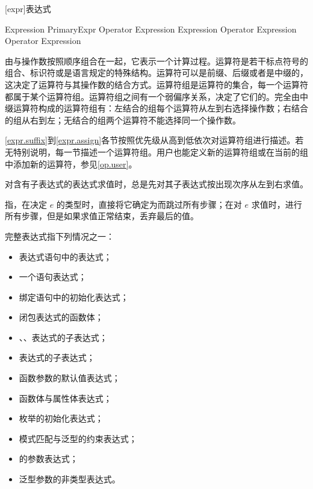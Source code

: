 
[expr]{表达式}

\begin{bnf}{Expression}
    PrimaryExpr \br
    Operator Expression \br
    Expression Operator \br
    Expression Operator Expression
\end{bnf}

\pnum
{}由与操作数按照顺序组合在一起，它表示一个计算过程。运算符是若干标点符号的组合、标识符或是语言规定的特殊结构。运算符可以是前缀、后缀或者是中缀的，这决定了运算符与其操作数的结合方式。运算符组是运算符的集合，每一个运算符都属于某个运算符组。运算符组之间有一个弱偏序关系，决定了它们的。完全由中缀运算符构成的运算符组有：左结合的组每个运算符从左到右选择操作数；右结合的组从右到左；无结合的组两个运算符不能选择同一个操作数。

\pnum
\ref{expr.suffix}到\ref{expr.assign}各节按照优先级从高到低依次对运算符组进行描述。若无特别说明，每一节描述一个运算符组。用户也能定义新的运算符组或在当前的组中添加新的运算符，参见\ref{op.user}。

\pnum
对含有子表达式的表达式求值时，总是先对其子表达式按出现次序从左到右求值。

\pnum
{}指，在决定 $e$ 的类型时，直接将它确定为而跳过所有步骤；在对 $e$ 求值时，进行所有步骤，但是如果求值正常结束，丢弃最后的值。

\pnum
完整表达式指下列情况之一：

\begin{itemize}
    \item 表达式语句中的表达式；
    \item 一个语句表达式；
    \item 绑定语句中的初始化表达式；
    \item 闭包表达式的函数体；
    \item {}、、表达式的子表达式；
    \item {}表达式的子表达式；
    \item 函数参数的默认值表达式；
    \item 函数体与属性体表达式；
    \item 枚举的初始化表达式；
    \item 模式匹配与泛型的约束表达式；
    \item {}的参数表达式；
    \item 泛型参数的非类型表达式。
\end{itemize}


